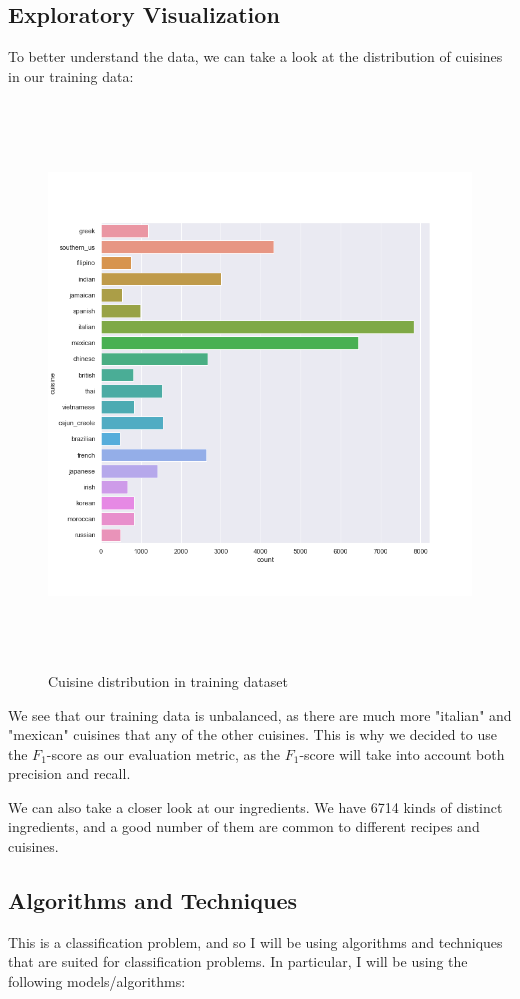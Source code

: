\documentclass[12pt]{article}
\begin{document}
\subsection{Exploratory Visualization}

To better understand the data, we can take a look at the distribution of cuisines in our training data:

\begin{figure}[!h]
\includegraphics[width=\textwidth, height=15cm]{cuisine-distribution.png}
\caption{Cuisine distribution in training dataset}
\end{figure}

\noindent
We see that our training data is unbalanced, as there are much more "italian" and "mexican" cuisines that any of the other cuisines. This is why we decided to use the $F_1$-score as our evaluation metric, as the $F_1$-score will take into account both precision and recall.

We can also take a closer look at our ingredients. We have 6714 kinds of distinct ingredients, and a good number of them are common to different recipes and cuisines.

\subsection{Algorithms and Techniques}
This is a classification problem, and so I will be using algorithms and techniques that are suited for classification problems. In particular, I will be using the following models/algorithms:
\end{document}
